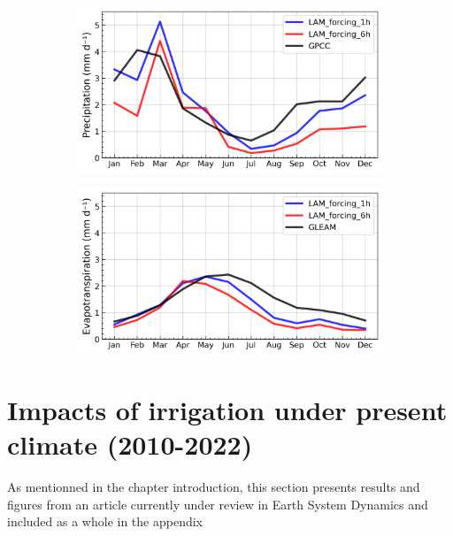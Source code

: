 \begin{figure}[htbp]
    \centering
    \begin{subfigure}[b]{0.49\textwidth}
        \caption{}
        \includegraphics[width=\textwidth]{images/chap4/forcing_sampling_freq/IP_seasonal_cycle_precip.png}
    \end{subfigure}
    \begin{subfigure}[b]{0.49\textwidth}
        \caption{}
        \includegraphics[width=\textwidth]{images/chap4/forcing_sampling_freq/IP_seasonal_cycle_evap.png}
    \end{subfigure}
    \caption{}
    \label{fig:forcing_sampling_freq_SC}
\end{figure}
\clearpage

\section{Impacts of irrigation under present climate (2010-2022)}
\label{sec:article1}
As mentionned in the chapter introduction, this section presents results and figures from an article currently under review in Earth System Dynamics and included as a whole in the appendix %


